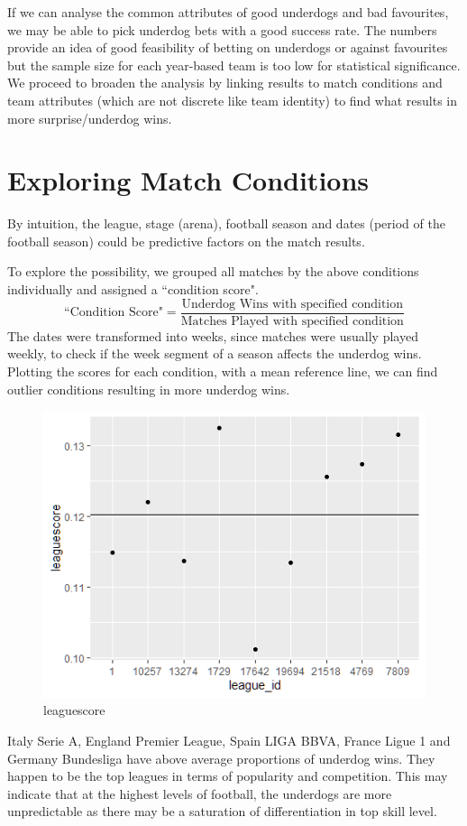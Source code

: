 \documentclass[12pt, a4paper]{article}
\begin{document}
If we can analyse the common attributes of good underdogs and bad favourites, we may be able to pick underdog bets with a good success rate. The numbers provide an idea of good feasibility of betting on underdogs or against favourites but the sample size for each year-based team is too low for statistical significance. We proceed to broaden the analysis by linking results to match conditions and team attributes (which are not discrete like team identity) to find what results in more surprise/underdog wins. 

\section{Exploring Match Conditions}
By intuition, the league, stage (arena), football season and dates (period of the football season) could be predictive factors on the match results.

To explore the possibility, we grouped all matches by the above conditions individually and assigned a ``condition score".
$$\text{``Condition Score"} = \frac{\text{Underdog Wins with specified condition}}{\text{Matches Played with specified condition}}$$
The dates were transformed into weeks, since matches were usually played weekly, to check if the week segment of a season affects the underdog wins. Plotting the scores for each condition, with a mean reference line, we can find outlier conditions resulting in more underdog wins.

\begin{figure}[!ht]
    \centering
    \includegraphics{league.png}
    \caption{leaguescore}
    \label{fig:league}
\end{figure}
Italy Serie A, England Premier League, Spain LIGA BBVA, France Ligue 1 and Germany Bundesliga have above average proportions of underdog wins. They happen to be the top leagues in terms of popularity and competition. This may indicate that at the highest levels of football, the underdogs are more unpredictable as there may be a saturation of differentiation in top skill level. 
\end{document}
